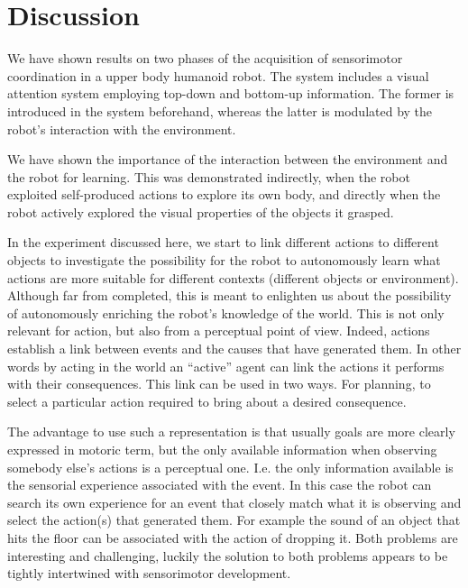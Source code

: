 \section{Discussion}
\label{sect:conclusion}
We have shown results on two phases of the acquisition of sensorimotor coordination in a upper body humanoid robot. The system includes a visual attention system employing top-down and bottom-up information. The former is introduced in the system beforehand, whereas the latter is modulated by the robot's interaction with the environment. 

We have shown the importance of the interaction between the environment and the robot for learning. This was demonstrated indirectly, when the robot exploited self-produced actions to explore its own body, and directly when the robot actively explored the visual properties of the objects it grasped.

In the experiment discussed here, we start to link different actions to different objects to investigate the possibility for the robot to autonomously learn what actions are more suitable for different contexts (different objects or environment). Although far from completed, this is meant to enlighten us about the possibility of autonomously enriching the robot's knowledge of the world. This is not only relevant for action, but also from a perceptual point of view. Indeed, actions establish a link between events and the causes that have generated them. In other words by acting in the world an ``active'' agent can link the actions it performs with their consequences. This link can be used in two ways. For planning, to select a particular action required to bring about a desired consequence.

The advantage to use such a representation is that usually goals are more clearly expressed in motoric term, but the only available information when observing somebody else's actions is a perceptual one. I.e. the only information available is the sensorial experience associated with the event. In this case the robot can search its own experience for an event that closely match what it is observing and select the action(s) that generated them. For example the sound of an object that hits the floor can be associated with the action of dropping it. Both problems are interesting and challenging, luckily the solution to both problems appears to be tightly intertwined with sensorimotor development.

